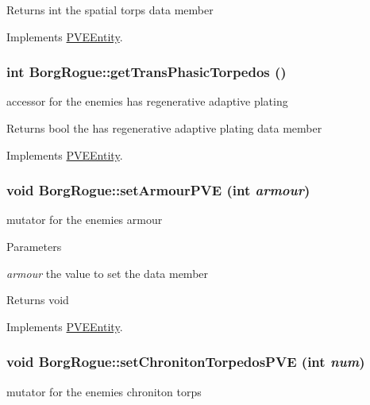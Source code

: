\begin{DoxyReturn}{Returns}
int the spatial torps data member 
\end{DoxyReturn}


Implements \hyperlink{classPVEEntity}{PVEEntity}.

\hypertarget{classBorgRogue_ab8d59b4fb9983b55896a0790e701ff7a}{
\subsubsection[{getTransPhasicTorpedos}]{\setlength{\rightskip}{0pt plus 5cm}int BorgRogue::getTransPhasicTorpedos ()}}
\label{db/d4f/classBorgRogue_ab8d59b4fb9983b55896a0790e701ff7a}
accessor for the enemies has regenerative adaptive plating

\begin{DoxyReturn}{Returns}
bool the has regenerative adaptive plating data member 
\end{DoxyReturn}


Implements \hyperlink{classPVEEntity}{PVEEntity}.

\hypertarget{classBorgRogue_af34a5a35c56e8a4758fa69e6937405d1}{
\subsubsection[{setArmourPVE}]{\setlength{\rightskip}{0pt plus 5cm}void BorgRogue::setArmourPVE (int {\em armour})}}
\label{db/d4f/classBorgRogue_af34a5a35c56e8a4758fa69e6937405d1}
mutator for the enemies armour


\begin{DoxyParams}{Parameters}
\item[{\em armour}]the value to set the data member\end{DoxyParams}
\begin{DoxyReturn}{Returns}
void 
\end{DoxyReturn}


Implements \hyperlink{classPVEEntity}{PVEEntity}.

\hypertarget{classBorgRogue_a1cf5168c6189366bd40bae7ec414b17f}{
\subsubsection[{setChronitonTorpedosPVE}]{\setlength{\rightskip}{0pt plus 5cm}void BorgRogue::setChronitonTorpedosPVE (int {\em num})}}
\label{db/d4f/classBorgRogue_a1cf5168c6189366bd40bae7ec414b17f}
mutator for the enemies chroniton torps


